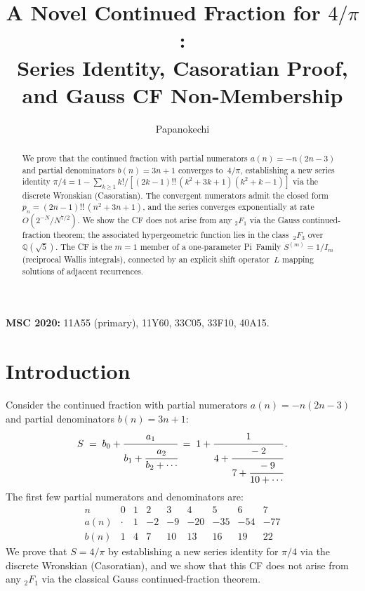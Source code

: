 \documentclass[11pt]{article}
\title{A Novel Continued Fraction for $4/\pi$:\\
Series Identity, Casoratian Proof, and Gauss CF Non-Membership}
\author{Papanokechi}
\date{}
\theoremstyle{remark}
\begin{document}
\maketitle

\begin{abstract}
We prove that the continued fraction with partial numerators
$a(n) = -n(2n{-}3)$ and partial denominators $b(n) = 3n{+}1$
converges to~$4/\pi$, establishing a new series identity
$\pi/4 = 1 - \sum_{k \geq 1} k!/[(2k{-}1)!!\,(k^2{+}3k{+}1)(k^2{+}k{-}1)]$
via the discrete Wronskian (Casoratian).
The convergent numerators admit the closed form
$p_n = (2n{-}1)!!\,(n^2{+}3n{+}1)$, and the series converges
exponentially at rate~$O(2^{-N}/N^{7/2})$.
We show the CF does not arise from any ${}_2F_1$ via the Gauss
continued-fraction theorem; the associated hypergeometric
function lies in the class~${}_2F_3$ over~$\mathbb{Q}(\sqrt5)$.
The CF is the $m{=}1$ member of a one-parameter Pi~Family
$S^{(m)} = 1/I_m$ (reciprocal Wallis integrals), connected by an
explicit shift operator~$L$ mapping solutions of adjacent
recurrences.
\end{abstract}

\noindent\textbf{MSC 2020:}
11A55 (primary), 11Y60, 33C05, 33F10, 40A15.

\section{Introduction}\label{sec:intro}

Consider the continued fraction with partial numerators $a(n)=-n(2n-3)$
and partial denominators $b(n)=3n+1$:
\begin{equation}\label{eq:cf}
  S \;=\; b_0 + \cfrac{a_1}{b_1 + \cfrac{a_2}{b_2 + \cdots}}
  \;=\; 1 + \cfrac{1}{4 + \cfrac{-2}{7 + \cfrac{-9}{10 + \cdots}}}\,.
\end{equation}
The first few partial numerators and denominators are:
\[
  \begin{array}{r|rrrrrrrr}
    n & 0 & 1 & 2 & 3 & 4 & 5 & 6 & 7 \\
    \hline
    a(n) & \cdot & 1 & -2 & -9 & -20 & -35 & -54 & -77 \\
    b(n) & 1 & 4 & 7 & 10 & 13 & 16 & 19 & 22
  \end{array}
\]
We prove that $S = 4/\pi$ by establishing a new series identity
for $\pi/4$ via the discrete Wronskian (Casoratian), and we show
that this CF does not arise from any ${}_2F_1$ via the classical
Gauss continued-fraction theorem.
\end{document}
